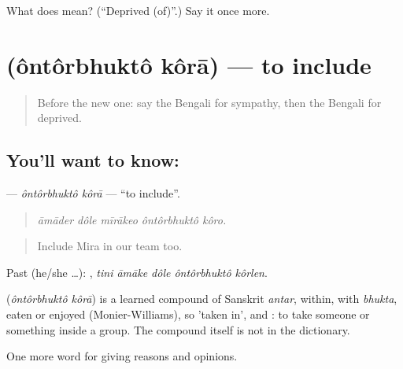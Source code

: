 \begin{tcolorbox}[breakable,colback=teal!4,colframe=teal!35!black,title={Before you move on}]
What does  mean? (\textquotedblleft{}Deprived (of)\textquotedblright{}.) Say it once more.
\end{tcolorbox}
\section[\texorpdfstring{\bn{অন্তর্ভুক্ত} \bn{করা} (ôntôrbhuktô kôrā)}{অন্তর্ভুক্ত করা (ôntôrbhuktô kôrā)}]{  (ôntôrbhuktô kôrā) — to include}

\label{lesson:BN-C352-ontorbhukto-kora}



\begin{quote}
Before the new one: say the Bengali for sympathy, then the Bengali for deprived.
\end{quote}

\subsection*{You'll want to know:  }
\textbf{ } — \emph{ôntôrbhuktô kôrā} — \textquotedblleft{}to include\textquotedblright{}.

\begin{quote}
    
\end{quote}

\begin{quote}
\emph{āmāder dôle mīrākeo ôntôrbhuktô kôro.}
\end{quote}

\begin{quote}
Include Mira in our team too.
\end{quote}

Past (he/she …):     , \emph{tini āmāke dôle ôntôrbhuktô kôrlen}.

\begin{cousinweb}
\textbf{ } (\emph{ôntôrbhuktô kôrā}) is a learned compound of Sanskrit \emph{antar}, within, with \emph{bhukta}, eaten or enjoyed (Monier-Williams), so 'taken in', and : to take someone or something inside a group. The compound itself is not in the dictionary.
\end{cousinweb}

\begin{grammarlens}[title={What you've built}]
One more word for giving reasons and opinions.
\end{grammarlens}

